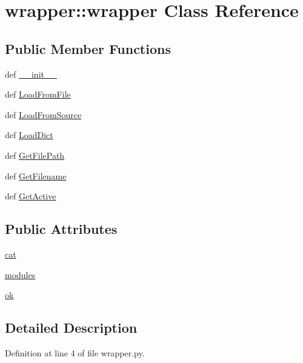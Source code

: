 \hypertarget{classwrapper_1_1wrapper}{
\section{wrapper::wrapper Class Reference}
\label{classwrapper_1_1wrapper}
}
\subsection*{Public Member Functions}
\begin{DoxyCompactItemize}
\item 
def \hyperlink{classwrapper_1_1wrapper_a28c722c437b535f48f73fe1a9ceb7673}{\_\-\_\-init\_\-\_\-}
\item 
def \hyperlink{classwrapper_1_1wrapper_ab315783e7a986b3e53d41877e3c41620}{LoadFromFile}
\item 
def \hyperlink{classwrapper_1_1wrapper_ae63461400283e16ea7d67219f8a397da}{LoadFromSource}
\item 
def \hyperlink{classwrapper_1_1wrapper_a0aef3490086e1e271039044259f1966c}{LoadDict}
\item 
def \hyperlink{classwrapper_1_1wrapper_a874fd66ca205b3e79a22e1d3ae7254c5}{GetFilePath}
\item 
def \hyperlink{classwrapper_1_1wrapper_ae0c31da2925082f7d02d24e665d9d8f2}{GetFilename}
\item 
def \hyperlink{classwrapper_1_1wrapper_ac836367c5b65afb2307339cbd5d30683}{GetActive}
\end{DoxyCompactItemize}
\subsection*{Public Attributes}
\begin{DoxyCompactItemize}
\item 
\hyperlink{classwrapper_1_1wrapper_a258ac98ee9d8cb53ca4ab2bc6fd5f376}{cat}
\item 
\hyperlink{classwrapper_1_1wrapper_af3a640a6e44b97a0a58aaa237fa9311b}{modules}
\item 
\hyperlink{classwrapper_1_1wrapper_a9922036691f66285e0eb72d3627d5352}{ok}
\end{DoxyCompactItemize}


\subsection{Detailed Description}


Definition at line 4 of file wrapper.py.

